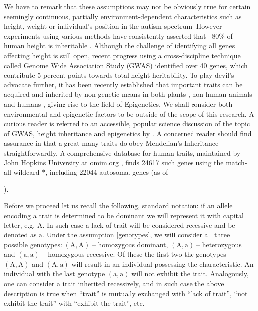 \documentclass{l4proj}
\newcommand{\genotype}[2]{\ensuremath{(\mathrm{#1}, \mathrm{#2})}}
\begin{document}
We have to remark that these assumptions may not be obviously true for certain seemingly continuous, partially environment-dependent characteristics such as height, weight or individual's position in the autism spectrum. However experiments using various methods have consistently asserted that ~80\% of human height is inheritable \parencite{heightTwins, heightJustSiblings}. Although the challenge of identifying all genes affecting height is still open, recent progress using a cross-discipline technique called Genome Wide Association Study (GWAS) identified over 40 genes, which contribute 5 percent points towards total height heritability. To play devil's advocate further, it has been recently established that important traits can be acquired and inherited by non-genetic means in both plants \parencite{palmOilKernel}, non-human animals \parencite{dolinoy_maternal_2007} and humans \parencite{yehuda_holocaust_2015}, giving rise to the field of Epigenetics. We shall consider both environmental and epigenetic factors to be outside of the scope of this research. A curious reader is referred to an accessible, popular science discussion of the topic of GWAS, height inheritance and epigenetics by \textcite{GWASDiscussion}. A concerned reader should find assurance in that a great many traits do obey Mendelian's Inheritance straightforwardly. A comprehensive database for human traits, maintained by John Hopkins University at omim.org \parencite{omim16}, finds 24617 such genes using the match-all wildcard $*$, including 22044 \gls{autosomal} genes (as of \date{March 13, 2016}).

Before we proceed let us recall the following, standard notation: if an \gls{allele} encoding a trait is determined to be dominant we will represent it with capital letter, e.g. $\mathrm{A}$. In such case a lack of trait will be considered recessive and be denoted as $\mathrm{a}$. Under the assumption \ref{genotypes}, we will consider all three possible genotypes: \genotype{A}{A} -- homozygous dominant, \genotype{A}{a} -- heterozygous and \genotype{a}{a} -- homozygous recessive. Of these the first two the genotypes \genotype{A}{A} and \genotype{A}{a} will result in an individual possessing the characteristic. An individual with the last genotype \genotype{a}{a} will not exhibit the trait. Analogously, one can consider a trait inherited recessively, and in such case the above description is true when ``trait'' is mutually exchanged with ``lack of trait'', ``not exhibit the trait'' with ``exhibit the trait'', etc.
\end{document}
